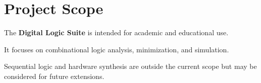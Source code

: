 \section{Project Scope}
The \textbf{Digital Logic Suite} is intended for academic and educational use.

\vspace{0.5em}

It focuses on combinational logic analysis, minimization, and simulation.

\vspace{0.5em}

Sequential logic and hardware synthesis are outside the current scope but may be considered for future extensions.
